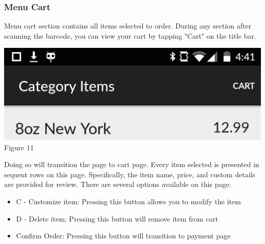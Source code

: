 \documentclass[12pt, titlepage]{article}
\begin{document}
\subsubsection{Menu Cart}

Menu cart section contains all items selected to order. During any section after scanning the barcode, you can view your cart by tapping "Cart" on the title bar.
\begin{center}\includegraphics[scale=0.15]{titlebar.png}	\linebreak Figure 11\end{center}

\noindent Doing so will transition the page to cart page. Every item selected is presented in sequent rows on this page. Specifically, the item name, price, and custom details are provided for review. There are several options available on this page:

\begin{itemize}
  \item C - Customize item: Pressing this button allows  you to modify the item
  \item D - Delete item: Pressing this button will remove item from cart
  \item Confirm Order: Pressing this button will transition to payment page
\end{itemize}
\end{document}
